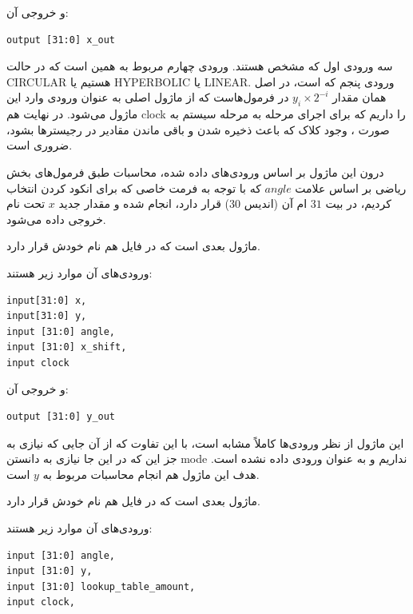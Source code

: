 \documentclass[12pt,titlepage,a4page , tikz , multi,table , svgnames,xcdraw]{article}
\begin{document}
و خروجی آن:

\begin{latin}
\begin{verbatim}
output [31:0] x_out
\end{verbatim}
\end{latin}

سه ورودی اول که مشخص هستند. ورودی چهارم مربوط به همین است که در حالت CIRCULAR هستیم یا HYPERBOLIC یا LINEAR. ورودی پنجم که  است، در اصل همان مقدار $y_i \times 2^{-i}$ در فرمول‌هاست که از ماژول اصلی به عنوان ورودی وارد این ماژول می‌شود. در نهایت هم clock را داریم که برای اجرای مرحله به مرحله سیستم به صورت ، وجود کلاک که باعث ذخیره شدن و باقی ماندن مقادیر در رجیسترها بشود، ضروری است.

درون این ماژول بر اساس ورودی‌های داده شده، محاسبات طبق فرمول‌های بخش ریاضی بر اساس علامت $angle$ که با توجه به فرمت خاصی که برای انکود کردن انتخاب کردیم، در بیت $31$ ام آن (اندیس $30$) قرار دارد، انجام شده و مقدار جدید $x$ تحت نام  خروجی داده می‌شود.

\hrulefill
 

ماژول بعدی  است که در فایل هم نام خودش قرار دارد.

 
 ورودی‌های آن موارد زیر هستند:

\begin{latin}
\begin{verbatim}
input[31:0] x,
input[31:0] y,
input [31:0] angle,
input [31:0] x_shift,
input clock
\end{verbatim}
\end{latin}

و خروجی آن:

\begin{latin}
\begin{verbatim}
output [31:0] y_out
\end{verbatim}
\end{latin}

این ماژول از نظر ورودی‌ها کاملاً مشابه  است، با این تفاوت که از آن جایی که نیازی به جز این که در این جا نیازی به دانستن mode نداریم و به عنوان ورودی داده نشده است. هدف این ماژول هم انجام محاسبات مربوط به $y$ است.

\hrulefill


ماژول بعدی  است که در فایل هم نام خودش قرار دارد.

 
 ورودی‌های آن موارد زیر هستند:

\begin{latin}
\begin{verbatim}
input [31:0] angle,
input [31:0] y,
input [31:0] lookup_table_amount,
input clock,
\end{verbatim}
\end{latin}
\end{document}
